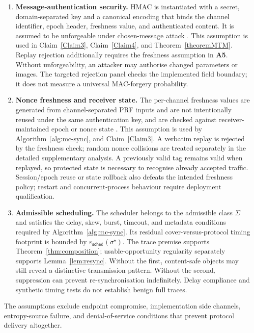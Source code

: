 \documentclass[pdflatex,sn-mathphys-num]{sn-jnl}%
\theoremstyle{definition}
\theoremstyle{game}
\theoremstyle{thmstyleone}%
\theoremstyle{thmstyletwo}%
\theoremstyle{thmstylethree}%
\begin{document}
\begin{enumerate}[
    label=\textbf{A\arabic*.},
    leftmargin=2.3em,
    itemsep=0.35em,
    topsep=0.35em
]
\item \textbf{Message-authentication security.}
HMAC is instantiated with a secret, domain-separated key and a
canonical encoding that binds the channel identifier, epoch
header, freshness value, and authenticated content. It is assumed
to be unforgeable under chosen-message attack
\cite{bellare1996keying,rfc2104}. This assumption is used in
Claim~\ref{Claim3}, Claim~\ref{Claim4}, and Theorem~\ref{theoremMTM}. Replay rejection additionally requires the freshness assumption in \textbf{A5}.
Without unforgeability, an attacker may authorise changed parameters or
images. The targeted rejection panel checks the implemented field boundary;
it does not measure a universal MAC-forgery probability.

\item \textbf{Nonce freshness and receiver state.}
The per-channel freshness values are generated from channel-separated PRF inputs and are not intentionally reused under the same
authentication key, and are checked against receiver-maintained
epoch or nonce state \cite{nist80090ar1}. This assumption is used
by Algorithm~\ref{alg:mc-sync}, and Claim~\ref{Claim3}. A verbatim replay is rejected by the
freshness check; random nonce collisions are treated separately
in the detailed supplementary analysis.
A previously valid tag remains valid when replayed, so protected state is
necessary to recognise already accepted traffic. Session/epoch reuse or
state rollback also defeats the intended freshness policy; restart and
concurrent-process behaviour require deployment qualification.

\item \textbf{Admissible scheduling.}
The scheduler belongs to the admissible class $\Sigma$ and
satisfies the delay, skew, burst, timeout, and metadata conditions
required by Algorithm~\ref{alg:mc-sync}. Its residual
cover-versus-protocol timing footprint is bounded by
$\varepsilon_{\mathsf{sched}}(\sigma^\star)$.
The trace premise supports Theorem~\ref{thm:composition}; usable-opportunity
regularity separately supports Lemma~\ref{lem:resync}. Without the first,
content-safe objects may still reveal a distinctive transmission pattern.
Without the second, suppression can prevent re-synchronisation indefinitely.
Delay compliance and synthetic timing tests do not establish benign full traces.

\end{enumerate}

The assumptions exclude endpoint compromise, implementation
side channels, entropy-source failure, and denial-of-service
conditions that prevent protocol delivery altogether.
\end{document}
